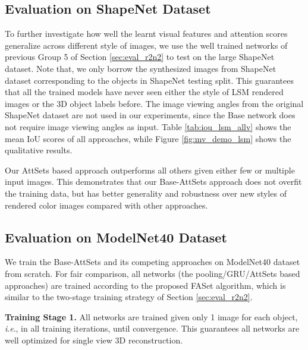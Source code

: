 \documentclass[twocolumn]{svjour3}    \pdfoutput=1
\newcommand{\nickname}{AttSets}
\newcommand{\faset}{FASet}
\newcommand{\ie}{\textit{i}.\textit{e}., }
\newcommand{\rev}{}
\begin{document}
\vspace{-0.45cm}
\subsection{Evaluation on ShapeNet Dataset}\label{sec:eval_lsm}
To further investigate how well the learnt visual features and attention scores generalize across different style of images, we use the well trained networks of previous Group 5 of Section \ref{sec:eval_r2n2} to test on the large ShapeNet dataset. Note that, we only borrow the synthesized images from ShapeNet dataset corresponding to the objects in ShapeNet testing split. This guarantees that all the trained models have never seen either the style of LSM rendered images or the 3D object labels before. The image viewing angles from the original ShapeNet dataset are not used in our experiments, since the Base network does not require image viewing angles as input. Table \ref{tab:iou_lsm_allv} shows the mean IoU scores of all approaches, while Figure \ref{fig:mv_demo_lsm} shows the qualitative results. 

Our \nickname{} based approach outperforms all others given either few or multiple input images. This demonstrates that our Base-AttSets approach does not overfit the training data, but has better generality and robustness over new styles of rendered color images compared with other approaches.

\vspace{-0.45cm}
\subsection{Evaluation on ModelNet40 Dataset}\label{sec:eval_modelnet40}
We train the Base-AttSets and its competing approaches on ModelNet40 dataset from scratch. For fair comparison, all networks \rev{(the pooling/GRU/\nickname{} based approaches)} are trained according to the proposed \faset{} algorithm, which is similar to the two-stage training strategy of Section \ref{sec:eval_r2n2}. 

\textbf{Training Stage 1.} All networks are trained given only 1 image for each object, \ie  in all training iterations, until convergence. This guarantees all networks are well optimized for single view 3D reconstruction.
\end{document}

